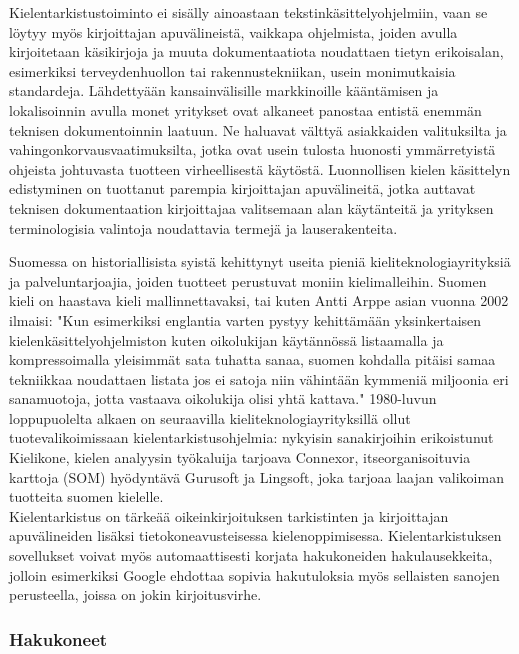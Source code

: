 \begin{multicols}{2}
Kielentarkistustoiminto ei sisälly ainoastaan
tekstinkäsittelyohjelmiin, vaan se löytyy myös kirjoittajan
apuvälineistä, vaikkapa ohjelmista, joiden avulla kirjoitetaan käsikirjoja ja muuta
dokumentaatiota noudattaen tietyn erikoisalan, esimerkiksi
terveydenhuollon tai rakennustekniikan, usein monimutkaisia
standardeja. Lähdettyään kansainvälisille markkinoille kääntämisen ja 
lokalisoinnin avulla monet yritykset ovat alkaneet
panostaa entistä enemmän teknisen dokumentoinnin laatuun. Ne haluavat
välttyä asiakkaiden valituksilta ja vahingonkorvausvaatimuksilta,
jotka ovat usein tulosta huonosti ymmärretyistä ohjeista johtuvasta
tuotteen virheellisestä käytöstä. Luonnollisen kielen
käsittelyn edistyminen on tuottanut parempia kirjoittajan
apuvälineitä, jotka auttavat teknisen dokumentaation kirjoittajaa 
valitsemaan alan käytänteitä ja yrityksen terminologisia
valintoja noudattavia termejä ja lauserakenteita.

Suomessa on historiallisista syistä kehittynyt useita pieniä
kieliteknologiayrityksiä ja palveluntarjoajia, joiden tuotteet
perustuvat moniin kielimalleihin. Suomen kieli on haastava kieli
mallinnettavaksi, tai kuten Antti Arppe asian vuonna 2002 ilmaisi:
"Kun esimerkiksi englantia varten pystyy kehittämään yksinkertaisen
kielenkäsittelyohjelmiston kuten oikolukijan käytännössä listaamalla
ja kompressoimalla yleisimmät sata tuhatta sanaa, suomen kohdalla
pitäisi samaa tekniikkaa noudattaen listata jos ei satoja niin
vähintään kymmeniä miljoonia eri sanamuotoja, jotta vastaava
oikolukija olisi yhtä kattava." \cite{EiPolkua} 1980-luvun
loppupuolelta alkaen on seuraavilla kieliteknologiayrityksillä ollut
tuotevalikoimissaan kielentarkistusohjelmia: nykyisin sanakirjoihin erikoistunut
Kielikone, kielen analyysin työkaluija tarjoava Connexor, itseorganisoituvia 
karttoja (SOM) hyödyntävä Gurusoft ja Lingsoft, joka tarjoaa laajan valikoiman 
tuotteita suomen kielelle.\\
Kielentarkistus on tärkeää oikeinkirjoituksen tarkistinten ja
kirjoittajan apuvälineiden lisäksi tietokoneavusteisessa
kielenoppimisessa.  Kielentarkistuksen sovellukset voivat myös
automaattisesti korjata hakukoneiden hakulausekkeita, jolloin
esimerkiksi Google ehdottaa sopivia hakutuloksia myös sellaisten
sanojen perusteella, joissa on jokin kirjoitusvirhe.



\subsubsection{Hakukoneet}



\end{multicols}
